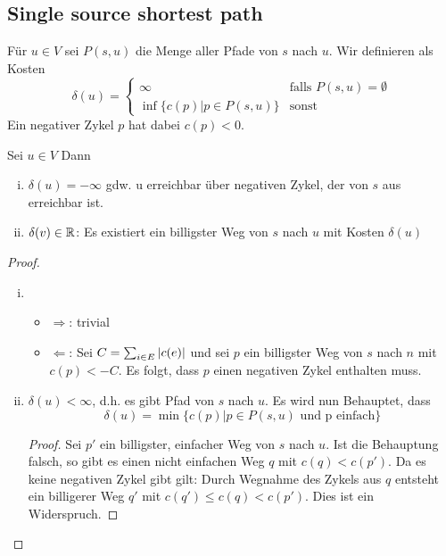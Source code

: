            \subsection{Single source shortest path}
                    Für $u \in V$ sei $P(s,u)$ die Menge aller Pfade von $s$ nach $u$. Wir definieren als Kosten
                    $$
                        \delta(u) = \begin{cases}
                                            \infty & \text{falls } P(s,u) = \emptyset \\
                                            \inf\{c(p) | p \in P(s,u)\} & \text{sonst}
                                        \end{cases}
                    $$ 
                    Ein negativer Zykel $p$ hat dabei $c(p) < 0$.
                    \begin{lemma}
                        Sei $u \in V$ Dann
                        \begin{enumerate}[i)]
                            \item $\delta(u) = -\infty$ gdw. u erreichbar über negativen Zykel, der von $s$ aus erreichbar ist.
                            \item $\delta(v) \in \mathbb{R}$: Es existiert ein billigster Weg von $s$ nach $u$ mit Kosten $\delta(u)$
                        \end{enumerate}
                    \end{lemma}
                    \begin{proof}
                        \begin{enumerate}[i)]
                            \item   \begin{itemize}
                                        \item $\Rightarrow$: trivial
                                        \item $\Leftarrow$: Sei $C= \sum_{i \in E}{\lvert c(e)\rvert}$ und sei $p$ ein billigster Weg von $s$ nach $n$ mit $c(p) < -C$. Es folgt, dass $p$ einen negativen Zykel enthalten muss.
                                    \end{itemize}   
                            \item $\delta(u) < \infty$, d.h. es gibt Pfad von $s$ nach $u$. Es wird nun Behauptet, dass 
                            $$
                                \delta(u) = \min\{c(p) | p \in P(s,u) \text{ und p einfach}\}
                            $$
                                \begin{proof}
                                    Sei $p'$ ein billigster, einfacher Weg von $s$ nach $u$. Ist die Behauptung falsch, so gibt es einen nicht einfachen Weg $q$ mit $c(q) < c(p')$. Da es keine negativen Zykel gibt gilt: Durch Wegnahme des Zykels aus $q$ entsteht ein billigerer Weg $q'$ mit $c(q') \leq c(q) < c(p')$. Dies ist ein Widerspruch.
                                \end{proof}                                                             
                        \end{enumerate}
                    \end{proof}
                    
